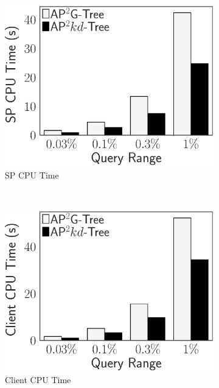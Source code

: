\begin{figure}[t]
    \centering
    \begin{subfigure}{.33\linewidth}
        \includegraphics[height=\ht\figbox]{exp-figs/access-control/index_1_sp.eps}
        \caption{SP CPU Time}
    \end{subfigure}~%
    \begin{subfigure}{.33\linewidth}
        \includegraphics[height=\ht\figbox]{exp-figs/access-control/index_1_user.eps}
        \caption{Client CPU Time}
    \end{subfigure}~%
    \begin{subfigure}{.33\linewidth}

\end{subfigure}
\end{figure}
